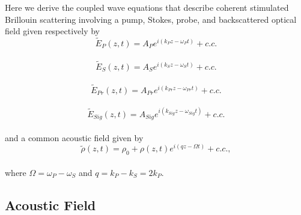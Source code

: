\documentclass[
sn-nature,
twocolumn
]{sn-jnl}%
\begin{document}
\begin{appendices}
Here we derive the coupled wave equations that describe coherent stimulated Brillouin scattering involving a pump, Stokes, probe, and backscattered optical field given respectively by
\\
\begin{equation}
    \tilde{E}_{P}(z,t) = A_{P}e^{i(k_{P}z - \omega_{P}t)} + c.c.
    \label{eq:Pump optical field}
\end{equation}
\\
\begin{equation}
    \tilde{E}_{S}(z,t) = A_{S}e^{i(k_{S}z - \omega_{S}t)} + c.c.
    \label{eq:Stokes optical field}
\end{equation}
\\
\begin{equation}
    \tilde{E}_{Pr}(z,t) = A_{Pr}e^{i(k_{Pr}z - \omega_{Pr}t)} + c.c.
    \label{eq:Probe optical field}
\end{equation}
\\
\begin{equation}
    \tilde{E}_{Sig}(z,t) = A_{Sig}e^{i(k_{Sig}z - \omega_{Sig}t)} + c.c.
    \label{eq:Signal optical field}
\end{equation}
\\
\noindent and a common acoustic field given by
\\
\begin{equation}
    \tilde{\rho}(z,t) = \rho_{0} + \rho(z,t)e^{i(qz - \Omega t)} + c.c.,
    \label{eq:acoustic field}
\end{equation}
\\
\noindent where $\Omega = \omega_{P} - \omega_{S}$ and $q = k_{P} - k_{S} = 2k_{P}$.


\subsection{Acoustic Field}\label{Coupled-Wave Equations:Acoustic Field}


\end{appendices}
\end{document}
